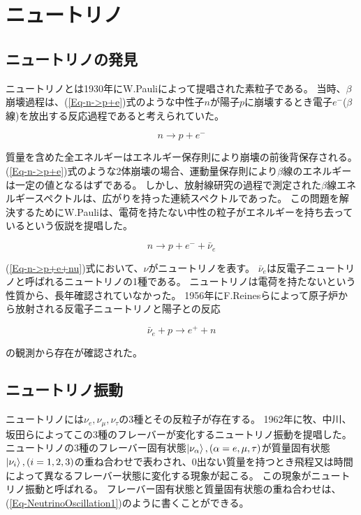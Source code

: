 \documentclass[a4paper,10pt]{jreport}
\begin{document}
\section{ニュートリノ}




\subsection{ニュートリノの発見}

ニュートリノとは1930年にW.Pauliによって提唱された素粒子である。
当時、$\beta$崩壊過程は、(\ref{Eq-n->p+e})式のような中性子$n$が陽子$p$に崩壊するとき電子$e^-$($\beta$線)を放出する反応過程であると考えられていた。

\begin{equation} \label{Eq-n->p+e}
	n \to p+e^-
\end{equation}

質量を含めた全エネルギーはエネルギー保存則により崩壊の前後背保存される。
(\ref{Eq-n->p+e})式のような2体崩壊の場合、運動量保存則により$\beta$線のエネルギーは一定の値となるはずである。
しかし、放射線研究の過程で測定された$\beta$線エネルギースペクトルは、広がりを持った連続スペクトルであった。
この問題を解決するためにW.Pauliは、電荷を持たない中性の粒子がエネルギーを持ち去っているという仮説を提唱した\cite{Pauli}。

\begin{equation} \label{Eq-n->p+e+nu}
	n \to p+e^-+\bar{\nu}_e
\end{equation}

(\ref{Eq-n->p+e+nu})式において、$\nu$がニュートリノを表す。
$\bar{\nu}_e$は反電子ニュートリノと呼ばれるニュートリノの1種である。
ニュートリノは電荷を持たないという性質から、長年確認されていなかった。
1956年にF.Reinesらによって原子炉から放射される反電子ニュートリノと陽子との反応

\begin{equation}
	\bar{\nu}_e +p \to e^+ +n
\end{equation}

の観測から存在が確認された。




\subsection{ニュートリノ振動}

ニュートリノには$\nu_e,\nu_{\mu},\nu_{\tau}$の3種とその反粒子が存在する。
1962年に牧、中川、坂田らによってこの3種のフレーバーが変化するニュートリノ振動を提唱した。
ニュートリノの3種のフレーバー固有状態$\ket{\nu_{\alpha}},(\alpha=e,\mu,\tau)$が質量固有状態$\ket{\nu_i},(i=1,2,3)$の重ね合わせで表わされ、0出ない質量を持つとき飛程又は時間によって異なるフレーバー状態に変化する現象が起こる。
この現象がニュートリノ振動と呼ばれる。
フレーバー固有状態と質量固有状態の重ね合わせは、(\ref{Eq-NeutrinoOscillation1})のように書くことができる。
\end{document}

